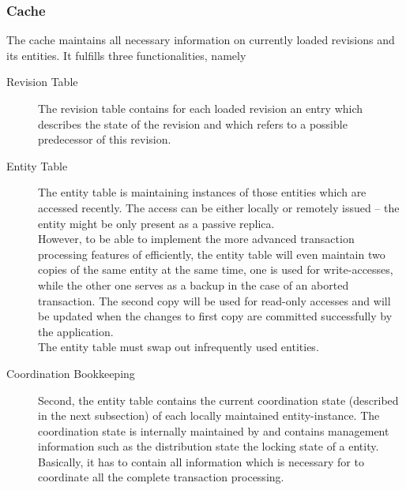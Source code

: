 \documentclass[a4paper, 10pt]{book}
\begin{document}
                                \subsubsection{Cache}

                                The cache maintains all necessary information on currently
                                loaded revisions and its entities. It fulfills three functionalities,
                                namely
                                \begin{description}
                                    \item[Revision Table] The revision table contains for each
                                        loaded revision an entry which describes the state of the revision
                                        and which refers to a possible predecessor of this revision.
                                    \item[Entity Table] The entity table is maintaining instances of
                                        those entities which are accessed recently. The access can be either
                                        locally or remotely issued -- the entity might be only present as a
                                        passive replica.\\
                                        However, to be able to implement the more advanced transaction
                                        processing features of \SYNEIGHT efficiently, the entity table will even
                                        maintain two copies of the same entity at the same time, one is used
                                        for write-accesses, while the other one serves as a backup in the
                                        case of an aborted transaction. The second copy will be used
                                        for read-only accesses and will be updated when the changes to first
                                        copy are committed successfully by the application.\\
                                        The entity table must swap out infrequently used entities.
                                    \item[Coordination Bookkeeping] Second, the entity table contains the
                                        current coordination state (described in the next subsection) of
                                        each locally maintained entity-instance. The coordination state is
                                        internally maintained by \SYNEIGHT and contains management information
                                        such as the distribution state the locking state of a entity.
                                        Basically, it has to contain all information which is necessary for
                                        \SYNEIGHT to coordinate all the complete transaction processing. 
                                \end{description}
\end{document}
